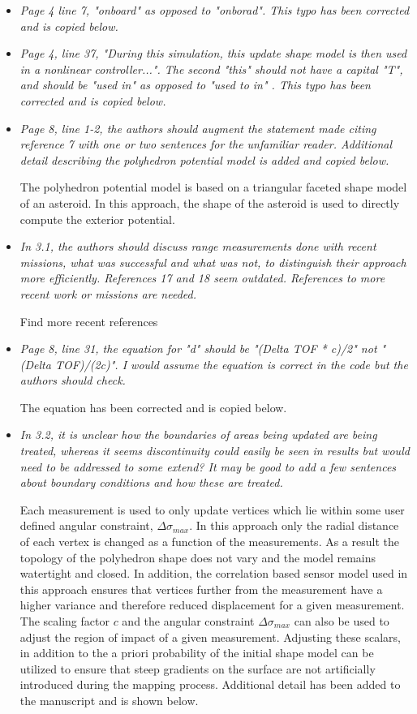 \documentclass[11pt]{article}
\newcommand{\comment}[1]{\item \itshape #1 \normalfont}
\begin{document}
\begin{itemize}
\comment{
Page 4 line 7, "onboard" as opposed to "onborad".
}
This typo has been corrected and is copied below.

\comment{
Page 4, line 37, "During this simulation, this update shape model is then used in a nonlinear controller...". The second "this" should not have a capital "T", and should be "used in" as opposed to "used to in" .
}
This typo has been corrected and is copied below.

\comment{
Page 8, line 1-2, the authors should augment the statement made citing reference 7 with one or two sentences for the unfamiliar reader.  
}
Additional detail describing the polyhedron potential model is added and copied below.

The polyhedron potential model is based on a triangular faceted shape model of an asteroid.
In this approach, the shape of the asteroid is used to directly compute the exterior potential.

\comment{
In 3.1, the authors should discuss range measurements done with recent missions, what was successful and what was not, to distinguish their approach more efficiently. 
References 17 and 18 seem outdated. 
References to more recent work or missions are needed.
}

Find more recent references

\comment{
Page 8, line 31, the equation for "d" should be "(Delta TOF * c)/2" not "(Delta TOF)/(2c)". I would assume the equation is correct in the code but the authors should check.
}

The equation has been corrected and is copied below.


\comment{
In 3.2, it is unclear how the boundaries of areas being updated are being treated, whereas it seems discontinuity could easily be seen in results but would need to be addressed to some extend? 
It may be good to add a few sentences about boundary conditions and how these are treated.
}

Each measurement is used to only update vertices which lie within some user defined angular constraint, \( \Delta \sigma_{max} \).
In this approach only the radial distance of each vertex is changed as a function of the measurements. 
As a result the topology of the polyhedron shape does not vary and the model remains watertight and closed.
In addition, the correlation based sensor model used in this approach ensures that vertices further from the measurement have a higher variance and therefore reduced displacement for a given measurement. 
The scaling factor \( c \) and the angular constraint \( \Delta \sigma_{max} \) can also be used to adjust the region of impact of a given measurement. 
Adjusting these scalars, in addition to the a priori probability of the initial shape model can be utilized to ensure that steep gradients on the surface are not artificially introduced during the mapping process.
Additional detail has been added to the manuscript and is shown below.


\end{itemize}
\end{document}
